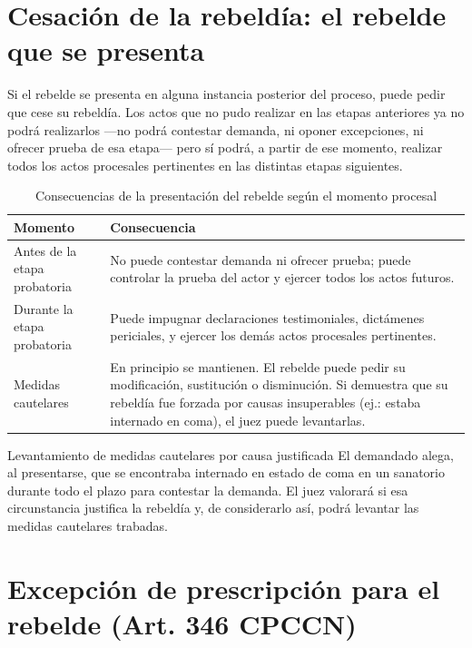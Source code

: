 \documentclass[12pt,oneside]{book}
\begin{document}
\section{Cesación de la rebeldía: el rebelde que se presenta}

Si el rebelde se presenta en alguna instancia posterior del proceso, puede pedir que cese su rebeldía. Los actos que no pudo realizar en las etapas anteriores ya no podrá realizarlos —no podrá contestar demanda, ni oponer excepciones, ni ofrecer prueba de esa etapa— pero sí podrá, a partir de ese momento, realizar todos los actos procesales pertinentes en las distintas etapas siguientes.

\begin{table}[H]
\centering
\caption{Consecuencias de la presentación del rebelde según el momento procesal}
\begin{tabularx}{\textwidth}{p{} X}
\toprule
\textbf{Momento} & \textbf{Consecuencia} \\
\midrule
Antes de la etapa probatoria & No puede contestar demanda ni ofrecer prueba; puede controlar la prueba del actor y ejercer todos los actos futuros. \\
Durante la etapa probatoria & Puede impugnar declaraciones testimoniales, dictámenes periciales, y ejercer los demás actos procesales pertinentes. \\
Medidas cautelares & En principio se mantienen. El rebelde puede pedir su modificación, sustitución o disminución. Si demuestra que su rebeldía fue forzada por causas insuperables (ej.: estaba internado en coma), el juez puede levantarlas. \\
\bottomrule
\end{tabularx}
\end{table}

\begin{example}{Levantamiento de medidas cautelares por causa justificada}
El demandado alega, al presentarse, que se encontraba internado en estado de coma en un sanatorio durante todo el plazo para contestar la demanda. El juez valorará si esa circunstancia justifica la rebeldía y, de considerarlo así, podrá levantar las medidas cautelares trabadas.
\end{example}

\section{Excepción de prescripción para el rebelde (Art. 346 CPCCN)}
\end{document}

